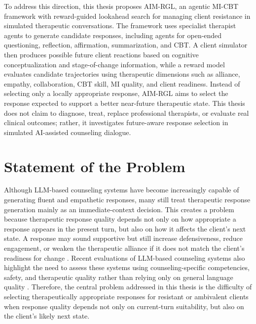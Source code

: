 To address this direction, this thesis proposes AIM-RGL, an agentic MI-CBT framework with reward-guided lookahead search for managing client resistance in simulated therapeutic conversations. The framework uses specialist therapist agents to generate candidate responses, including agents for open-ended questioning, reflection, affirmation, summarization, and CBT. A client simulator then produces possible future client reactions based on cognitive conceptualization and stage-of-change information, while a reward model evaluates candidate trajectories using therapeutic dimensions such as alliance, empathy, collaboration, CBT skill, MI quality, and client readiness. Instead of selecting only a locally appropriate response, AIM-RGL aims to select the response expected to support a better near-future therapeutic state. This thesis does not claim to diagnose, treat, replace professional therapists, or evaluate real clinical outcomes; rather, it investigates future-aware response selection in simulated AI-assisted counseling dialogue.

\section{Statement of the Problem}

Although LLM-based counseling systems have become increasingly capable of generating fluent and empathetic responses, many still treat therapeutic response generation mainly as an immediate-context decision. This creates a problem because therapeutic response quality depends not only on how appropriate a response appears in the present turn, but also on how it affects the client's next state. A response may sound supportive but still increase defensiveness, reduce engagement, or weaken the therapeutic alliance if it does not match the client's readiness for change \cite{rogers1957necessary,bordin1979alliance}. Recent evaluations of LLM-based counseling systems also highlight the need to assess these systems using counseling-specific competencies, safety, and therapeutic quality rather than relying only on general language quality \cite{hua2025scopingreview,nguyen2025llmcounseling}. Therefore, the central problem addressed in this thesis is the difficulty of selecting therapeutically appropriate responses for resistant or ambivalent clients when response quality depends not only on current-turn suitability, but also on the client's likely next state.


